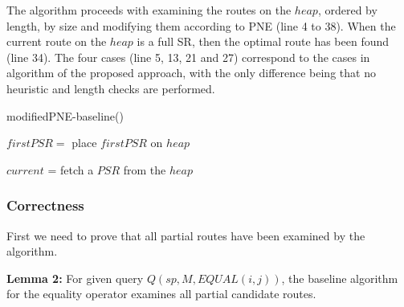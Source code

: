 The algorithm \texttt{} proceeds with examining the routes on the $heap$, ordered by length, by size and modifying them according to PNE (line 4 to 38). When the current route on the $heap$ is a full SR, then the optimal route has been found (line 34). The four cases (line 5, 13, 21 and 27) correspond to the cases in algorithm of the proposed approach, with the only difference being that no heuristic and length checks are performed. \newline

\raggedbottom

\begin{algorithm}[H]
\caption{modifiedPNE-baseline()}
\label{alg:mPNE_baseline}
	
	
	$firstPSR =$\;
	place $firstPSR$ on $heap$\;
	
	$current$ = fetch a $PSR$ from the $heap$\;
	
\end{algorithm}

\subsubsection{Correctness}
First we need to prove that all partial routes have been examined by the algorithm.

\textbf{Lemma 2:} For given query $Q(sp, M, EQUAL(i, j))$, the baseline algorithm for the equality operator examines all partial candidate routes.

